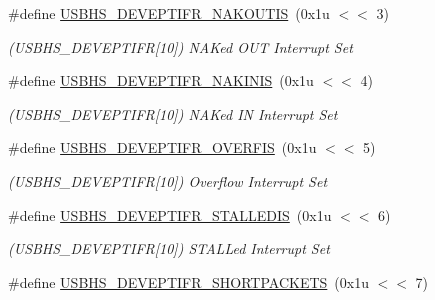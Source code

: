 \begin{DoxyCompactItemize}
\#define \mbox{\hyperlink{group__SAMS70__USBHS_ga7a7af5d0054bf3e037f35ccc1c952906}{U\+S\+B\+H\+S\+\_\+\+D\+E\+V\+E\+P\+T\+I\+F\+R\+\_\+\+N\+A\+K\+O\+U\+T\+IS}}~(0x1u $<$$<$ 3)
\begin{DoxyCompactList}\small\item\em (U\+S\+B\+H\+S\+\_\+\+D\+E\+V\+E\+P\+T\+I\+FR\mbox{[}10\mbox{]}) N\+A\+Ked O\+UT Interrupt Set \end{DoxyCompactList}\item 
\mbox{\label{group__SAMS70__USBHS_ga053fa6b866c9381fa1de30765cbd3408}} 
\#define \mbox{\hyperlink{group__SAMS70__USBHS_ga053fa6b866c9381fa1de30765cbd3408}{U\+S\+B\+H\+S\+\_\+\+D\+E\+V\+E\+P\+T\+I\+F\+R\+\_\+\+N\+A\+K\+I\+N\+IS}}~(0x1u $<$$<$ 4)
\begin{DoxyCompactList}\small\item\em (U\+S\+B\+H\+S\+\_\+\+D\+E\+V\+E\+P\+T\+I\+FR\mbox{[}10\mbox{]}) N\+A\+Ked IN Interrupt Set \end{DoxyCompactList}\item 
\mbox{\label{group__SAMS70__USBHS_ga5f6aa026b3b128a93676d9c9d91d18ef}} 
\#define \mbox{\hyperlink{group__SAMS70__USBHS_ga5f6aa026b3b128a93676d9c9d91d18ef}{U\+S\+B\+H\+S\+\_\+\+D\+E\+V\+E\+P\+T\+I\+F\+R\+\_\+\+O\+V\+E\+R\+F\+IS}}~(0x1u $<$$<$ 5)
\begin{DoxyCompactList}\small\item\em (U\+S\+B\+H\+S\+\_\+\+D\+E\+V\+E\+P\+T\+I\+FR\mbox{[}10\mbox{]}) Overflow Interrupt Set \end{DoxyCompactList}\item 
\mbox{\label{group__SAMS70__USBHS_ga846303c6eec66e5d8173a46e59853b49}} 
\#define \mbox{\hyperlink{group__SAMS70__USBHS_ga846303c6eec66e5d8173a46e59853b49}{U\+S\+B\+H\+S\+\_\+\+D\+E\+V\+E\+P\+T\+I\+F\+R\+\_\+\+S\+T\+A\+L\+L\+E\+D\+IS}}~(0x1u $<$$<$ 6)
\begin{DoxyCompactList}\small\item\em (U\+S\+B\+H\+S\+\_\+\+D\+E\+V\+E\+P\+T\+I\+FR\mbox{[}10\mbox{]}) S\+T\+A\+L\+Led Interrupt Set \end{DoxyCompactList}\item 
\mbox{\label{group__SAMS70__USBHS_ga0296712d52b09beb0817d8f5c62cb452}} 
\#define \mbox{\hyperlink{group__SAMS70__USBHS_ga0296712d52b09beb0817d8f5c62cb452}{U\+S\+B\+H\+S\+\_\+\+D\+E\+V\+E\+P\+T\+I\+F\+R\+\_\+\+S\+H\+O\+R\+T\+P\+A\+C\+K\+E\+TS}}~(0x1u $<$$<$ 7)
$$
\end{DoxyCompactItemize}
